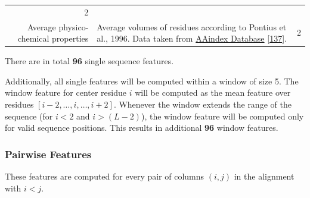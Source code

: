 \documentclass[12pt,a4paper,twoside]{book}
\theoremstyle{definition}
\theoremstyle{definition}
\theoremstyle{remark}
\begin{document}
\begin{longtable}[]{@{}rlc@{}}
\begin{minipage}[t]{0.18\columnwidth}
2\strut
\end{minipage}\tabularnewline
\begin{minipage}[t]{0.23\columnwidth}\raggedleft\strut
Average physico-chemical properties\strut
\end{minipage} & \begin{minipage}[t]{0.50\columnwidth}\raggedright\strut
Average volumes of residues according to Pontius et al., 1996. Data
taken from
\href{http://www.genome.jp/dbget-bin/www_bget?aaindex:PONJ960101}{AAindex
Database} {[}\protect\hyperlink{ref-Kawashima2008}{137}{]}.\strut
\end{minipage} & \begin{minipage}[t]{0.18\columnwidth}\centering\strut
2\strut
\end{minipage}\tabularnewline
\bottomrule
\end{longtable}

There are in total \textbf{96} single sequence features.

Additionally, all single features will be computed within a window of
size 5. The window feature for center residue \(i\) will be computed as
the mean feature over residues \([i-2, \ldots, i, \ldots, i+2]\).
Whenever the window extends the range of the sequence (for \(i\!<\!2\)
and \(i\!>\!(L-2)\)), the window feature will be computed only for valid
sequence positions. This results in additional \textbf{96} window
features.

\subsubsection{Pairwise Features}\label{seq-features-pairwise}

These features are computed for every pair of columns \((i, j)\) in the
alignment with \(i<j\).
\end{document}
